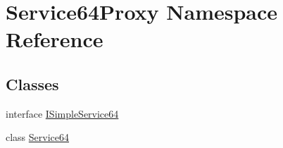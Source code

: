 \hypertarget{namespace_service64_proxy}{}\section{Service64\+Proxy Namespace Reference}
\label{namespace_service64_proxy}
\subsection*{Classes}
\begin{DoxyCompactItemize}
\item 
interface \mbox{\hyperlink{interface_service64_proxy_1_1_i_simple_service64}{I\+Simple\+Service64}}
\item 
class \mbox{\hyperlink{class_service64_proxy_1_1_service64}{Service64}}
\end{DoxyCompactItemize}
